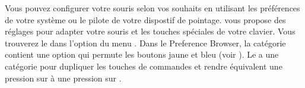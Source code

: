 \documentclass[a4paper,10pt,twoside]{book}
\begin{document}

Vous pouvez configurer votre souris selon vos souhaits en utilisant les préférences de votre système ou le pilote de votre dispostif de pointage.
\sq vous propose des réglages pour adapter votre souris et les touches spéciales de votre clavier. Vous trouverez le  dans l'option  du menu .
Dans le Preference Browser, la catégorie  contient une option  qui permute les boutons jaune et bleu (voir ). Le  a une catégorie pour dupliquer les touches de commandes et rendre équivalent une pression sur  à une pression sur .

\end{document}
